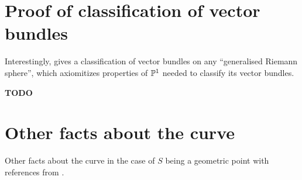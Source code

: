 \documentclass{article}
\begin{document}


\section{Proof of classification of vector bundles}

Interestingly,
\cite[Section 5.6]{FF18}
gives a classification of vector bundles on any
``generalised Riemann sphere'',
which axiomitizes properties of $\mathbb{P}^1$ needed to classify its vector bundles.

\textbf{TODO}

\section{Other facts about the curve}

Other facts about the curve 
in the case of $S$ being a geometric point
with references from \cite{FF18}.

\end{document}
